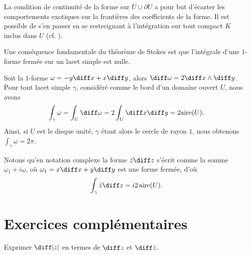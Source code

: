 
\begin{rem}
La condition de continuité de la forme sur $U \cup \partial U$ a pour but d'écarter les comportements exotiques sur la frontières des coefficients de la forme. Il est possible de s'en passer en se restreignant à l'intégration sur tout compact $K$ inclus dans $U$ (cf. \cite{cartan1977}).
\end{rem}

Une conséquence fondamentale du théorème de Stokes est que l'intégrale d'une
$1$-forme fermée sur un lacet simple est nulle.

\begin{exem}
Soit la $1$-forme $\omega=-y \diff x + x \diff y$, alors $\diff \omega = 2 \diff x \wedge \diff y$. Pour tout lacet simple $\gamma$, considéré comme le bord d'un domaine ouvert $U$, nous avons
\[\int_\gamma \omega = \int_U \diff \omega = 2 \int_U \diff x \diff y = 2 \text{aire}(U).\]
Ainsi, si $U$ est le disque unité, $\gamma$ étant alors le cercle de rayon $1$, nous obtenons $\int_\gamma \omega =2 \pi$.

Notons qu'en notation complexe la forme $\bar{z}\diff z$ s'écrit comme la somme $\omega_1 + i \omega$, où $\omega_1=x \diff x + y \diff y$ est une forme fermée, d'où
\[\int _\gamma \bar{z} \diff z=  i  2 \, \text{aire}(U).\]
\end{exem}

\section{Exercices complémentaires}

\begin{exer}
Exprimer $\diff \lvert z \rvert$ en termes de $\diff z$ et $\diff \bar{z}$.
\end{exer}

